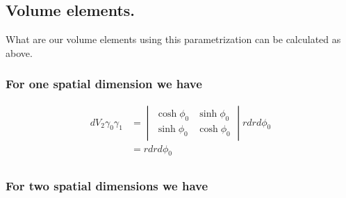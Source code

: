 \subsection{Volume elements. }

What are our volume elements using this parametrization can be calculated as above.

\subsubsection{For one spatial dimension we have }

\begin{align*}
dV_2 \gamma_0 \gamma_1 
&=
\begin{vmatrix}
\cosh \phi_0 & \sinh\phi_0  \\
\sinh \phi_0 & \cosh\phi_0 
\end{vmatrix} r dr d\phi_0 \\
&=
r dr d\phi_0 \\
\end{align*}

\subsubsection{For two spatial dimensions we have }

